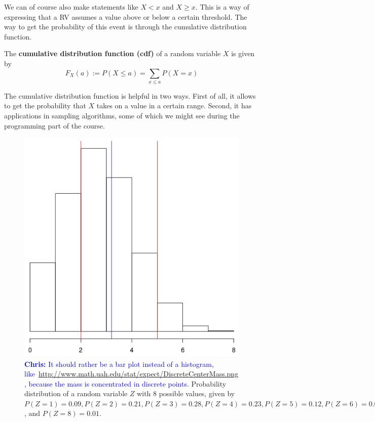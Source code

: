 \documentclass[a4paper,11pt,leqno]{report}
\newcommand{\chris}[1]{ \textcolor{blue}{\textbf{Chris:} #1}}
\begin{document}
We can of course also make statements
like $ X < x $ and $ X \geq x $. This is a way of expressing that a RV assumes a value above or below a certain
threshold. The way to get the probability of this event is through the cumulative distribution function.

\newpage
\begin{Definition}
The \textbf{cumulative distribution function (cdf)} of a random variable $ X $ is given by
$$ F_{X}(a) := P(X \leq a) = {\underset{x \leq a}{\sum}}P(X=x) $$
\end{Definition}

The cumulative distribution function is helpful in two ways. First of all, it allows to get the probability that
$ X $ takes on a value in a certain range. Second, it has applications in sampling algorithms, some of which we might
see during the programming part of the course.

\begin{figure}
\center
\includegraphics[scale=.3]{histogram.png}
\caption{\chris{It should rather be a bar plot instead of a histogram, like~\url{http://www.math.uah.edu/stat/expect/DiscreteCenterMass.png}, because the mass is concentrated in discrete points.} Probability distribution of a random variable $Z$ with $ 8 $ possible values, given by $ P(Z = 1) = 0.09,  P(Z = 2) = 0.21, P(Z = 3) = 0.28, P(Z = 4) = 0.23, P(Z = 5) = 0.12, P(Z = 6) = 0.04, P(Z = 7) = 0.02$, and $ P(Z = 8) = 0.01$.
}
\label{binomplot}
\end{figure}
\end{document}
